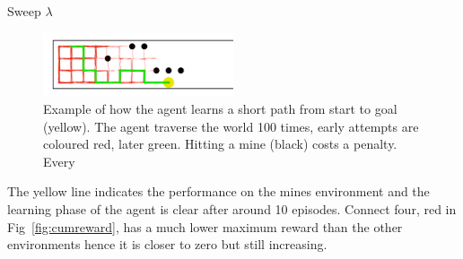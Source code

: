 Sweep $\lambda$
\begin{figure}[h]
    \centering
    \includegraphics[width=0.5\textwidth]{../data/minPlot.png}
    \caption{Example of how the agent learns a short path from start to goal (yellow). The agent traverse the world 100 times, early attempts are coloured red, later green. Hitting a mine (black) costs a penalty. Every  }
    \label{fig:awesome_image}
\end{figure}

The yellow line indicates the performance on the mines environment and the learning phase of the agent is clear after around 10 episodes. Connect four, red in Fig~\ref{fig:cumreward}, has a much lower maximum reward than the other environments hence it is closer to zero but still increasing.
